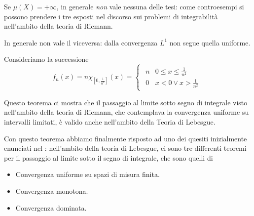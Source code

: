 \begin{attention}
	Se $\mu\left(X\right)=+\infty$, in generale \textit{non} vale nessuna delle tesi: come controesempi si possono prendere i tre esposti nel discorso sui problemi di integrabilità nell'ambito della teoria di Riemann. %
\end{attention}
In generale non vale il viceversa: dalla convergenza $L^1$ non segue quella uniforme.
\begin{example}
	Consideriamo la successione
	\begin{equation*}
		f_n\left(x\right)=n\chi_{\left[0,\frac{1}{n^2}\right]}\left(x\right)=
		\begin{cases}
			\begin{array}{ll}
				n&0\leq x\leq\frac{1}{n^2}\\
				0&x< 0\vee x>\frac{1}{n^2}
			\end{array}
		\end{cases}
	\end{equation*}
\end{example}
\begin{observe}
	Questo teorema ci mostra che il passaggio al limite sotto segno di integrale visto nell'ambito della teoria di Riemann, che contemplava la convergenza uniforme su intervalli limitati, è valido anche nell'ambito della Teoria di Lebesgue.
\end{observe}
Con questo teorema abbiamo finalmente risposto ad uno dei quesiti inizialmente enunciati nel : nell'ambito della teoria di Lebesgue, ci sono tre differenti teoremi per il passaggio al limite sotto il segno di integrale, che sono quelli di
\begin{itemize}
	\item Convergenza uniforme su spazi di misura finita.
	\item Convergenza monotona.
	\item Convergenza dominata.
\end{itemize}

